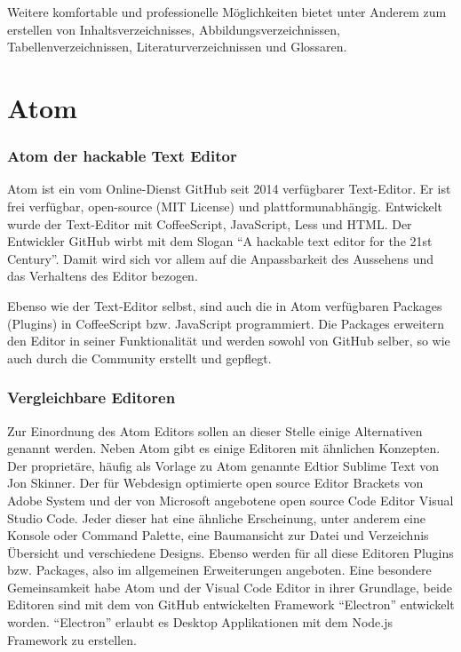     Weitere komfortable und professionelle Möglichkeiten bietet \tex unter Anderem zum erstellen von Inhaltsverzeichnisses, Abbildungsverzeichnissen, Tabellenverzeichnissen, Literaturverzeichnissen und Glossaren.

\part{Atom}
    \section{Atom der hackable Text Editor}
    Atom ist ein vom Online-Dienst GitHub seit 2014 verfügbarer Text-Editor. Er ist frei verfügbar, open-source (MIT License) und plattformunabhängig. Entwickelt wurde der Text-Editor mit CoffeeScript, JavaScript, Less und HTML. Der Entwickler GitHub wirbt mit dem Slogan "`A hackable text editor for the 21st Century"'. Damit wird sich vor allem auf die Anpassbarkeit des Aussehens und das Verhaltens des Editor bezogen.

    Ebenso wie der Text-Editor selbst, sind auch die in Atom verfügbaren Packages (Plugins) in CoffeeScript bzw. JavaScript programmiert. Die Packages erweitern den Editor in seiner Funktionalität und werden sowohl von GitHub selber, so wie auch durch die Community erstellt und gepflegt.

    \section{Vergleichbare Editoren}
    Zur Einordnung des Atom Editors sollen an dieser Stelle einige Alternativen genannt werden. Neben Atom gibt es einige Editoren mit ähnlichen Konzepten. Der proprietäre, häufig als Vorlage zu Atom genannte Edtior Sublime Text von Jon Skinner. Der für Webdesign optimierte open source Editor Brackets von Adobe System und der von Microsoft angebotene open source Code Editor Visual Studio Code. Jeder dieser hat eine ähnliche Erscheinung, unter anderem eine Konsole oder Command Palette, eine Baumansicht zur Datei und Verzeichnis Übersicht und verschiedene Designs. Ebenso werden für all diese Editoren Plugins bzw. Packages, also im allgemeinen Erweiterungen angeboten. Eine besondere Gemeinsamkeit habe Atom und der Visual Code Editor in ihrer Grundlage, beide Editoren sind mit dem von GitHub entwickelten Framework "`Electron"' entwickelt worden. "`Electron"' erlaubt es Desktop Applikationen mit dem Node.js Framework zu erstellen. 

